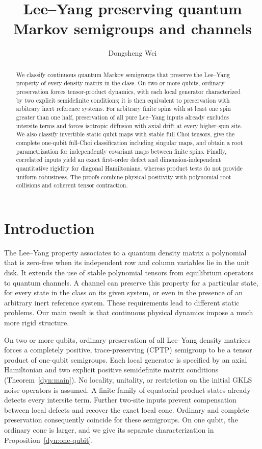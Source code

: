 \documentclass[reqno]{amsart}
\title[Lee--Yang quantum dynamics and channels]{Lee--Yang preserving quantum Markov semigroups and channels}
\author{Dongsheng Wei}
\date{}
\theoremstyle{definition}
\theoremstyle{remark}
\begin{document}
\begin{abstract}
We classify continuous quantum Markov semigroups that preserve the
Lee--Yang property of every density matrix in the class. On two or more
qubits, ordinary preservation forces tensor-product dynamics, with each
local generator characterized by two explicit semidefinite conditions;
it is then equivalent to preservation with arbitrary inert reference
systems. For arbitrary finite spins with at least one spin greater than
one half, preservation of all pure Lee--Yang inputs already excludes
intersite terms and forces isotropic diffusion with axial drift at every
higher-spin site. We also classify invertible static qubit maps with
stable full Choi tensors, give the complete one-qubit full-Choi
classification including singular maps,
and obtain a root parametrization for independently covariant maps
between finite spins. Finally, correlated inputs yield an exact
first-order defect and dimension-independent quantitative rigidity for
diagonal Hamiltonians, whereas product tests do not provide uniform
robustness. The proofs combine physical positivity with polynomial
root collisions and coherent tensor contraction.
\end{abstract}
\maketitle
\tableofcontents
\clearpage
\section{Introduction}\label{intro:section}
The Lee--Yang property associates to a quantum density matrix a polynomial
that is zero-free when its independent row and column variables lie in the
unit disk. It extends the use of stable polynomial tensors from equilibrium
operators to quantum channels. A channel can preserve this property for a
particular state, for every state in the class on its given system, or even
in the presence of an arbitrary inert reference system. These requirements
lead to different static problems. Our main result is that continuous
physical dynamics impose a much more rigid structure.

On two or more qubits, ordinary preservation of all Lee--Yang density
matrices forces a completely positive, trace-preserving (CPTP) semigroup
to be a tensor product of one-qubit
semigroups. Each local generator is specified by an axial Hamiltonian and
two explicit positive semidefinite matrix conditions
(Theorem~\ref{dyn:main}). No locality, unitality, or restriction on the
initial GKLS noise operators is assumed. A finite family of equatorial
product states already detects every intersite term. Further two-site
inputs prevent compensation between local defects and recover the exact
local cone. Ordinary and complete preservation consequently coincide for
these semigroups. On one qubit, the ordinary cone is larger, and we give
its separate characterization in Proposition~\ref{dyn:one-qubit}.
\end{document}
